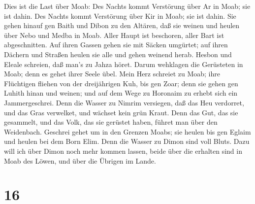  Dies ist die Last über Moab: Des Nachts kommt Verstörung
über Ar in Moab; sie ist dahin. Des Nachts kommt Verstörung über Kir in
Moab; sie ist dahin.  Sie gehen hinauf gen Baith und Dibon
zu den Altären, daß sie weinen und heulen über Nebo und Medba in Moab.
Aller Haupt ist beschoren, aller Bart ist abgeschnitten. 
Auf ihren Gassen gehen sie mit Säcken umgürtet; auf ihren Dächern und
Straßen heulen sie alle und gehen weinend herab.  Hesbon und
Eleale schreien, daß man's zu Jahza höret. Darum wehklagen die
Gerüsteten in Moab; denn es gehet ihrer Seele übel.  Mein
Herz schreiet zu Moab; ihre Flüchtigen fliehen von der dreijährigen Kuh,
bis gen Zoar; denn sie gehen gen Luhith hinan und weinen; und auf dem
Wege zu Horonaim zu erhebt sich ein Jammergeschrei.  Denn
die Wasser zu Nimrim versiegen, daß das Heu verdorret, und das Gras
verwelket, und wächset kein grün Kraut.  Denn das Gut, das
sie gesammelt, und das Volk, das sie gerüstet haben, führet man über den
Weidenbach.  Geschrei gehet um in den Grenzen Moabs; sie
heulen bis gen Eglaim und heulen bei dem Born Elim.  Denn
die Wasser zu Dimon sind voll Bluts. Dazu will ich über Dimon noch mehr
kommen lassen, beide über die erhalten sind in Moab des Löwen, und über
die Übrigen im Lande.

\hypertarget{section-15}{%
\section{16}\label{section-15}}

